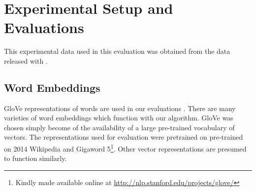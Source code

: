 \documentclass[11pt]{article}
\theoremstyle{plain}
\theoremstyle{definition}
\begin{document}
\begin{comment}
Even with these techniques to decrease the time taken, running the search over long sentences takes significant amount of time: on the order of 10 seconds for a sentence with 18 words, and increasing rapidly. For this reason the ordering step is only carried out for the BOWs corresponding to reference sentences with no more than 18 words.
 
  
Of course, for some sentences the BOW can not always be resolved to the correct ordering -- when some words can be swapped in position and still have a valid and likely sentence. For example ``Show me flights from London to New York.'' is just as reasonable as  ``Show me flights from New York to London.''. On the other hand often one ordering is far more likely and reasonable than the others, "The dog chased the cat." is much more often correct than "The cat chased the dog.", it is also preferable over "The cat the dog chased." though all three are grammatically correct. It is assumed here that, for most bags of words there is one ordering that is far far more likely to occur than the others, and thus is the correct ordering. The results for the Oracle BOW in the next section suggest this assumption is largely correct -- at least for the Brown Corpus.

\end{comment}



\section{Experimental Setup and Evaluations} \label{evalsettings}


This experimental data used in this evaluation was obtained from the data released with .

\subsection{Word Embeddings}
GloVe representations of words are used in our evaluations \parencite{pennington2014glove}. There are many varieties of word embeddings which function with our algorithm. GloVe was chosen simply become of the availability of a large pre-trained vocabulary of vectors. The representations used for evaluation were pretrained on pre-trained on 2014 Wikipedia and Gigaword 5\footnote{Kindly made available online at \url{http://nlp.stanford.edu/projects/glove/}}.  Other vector representations are presumed to function similarly.
\end{document}

